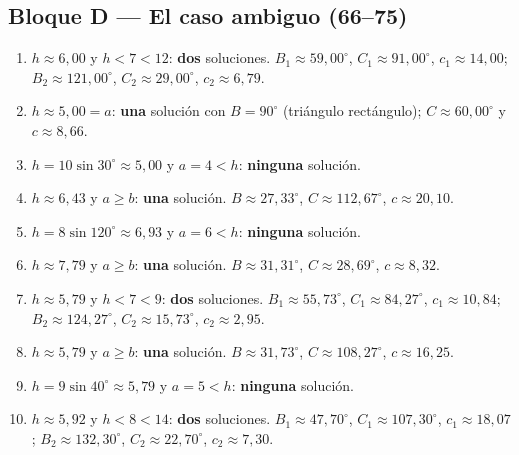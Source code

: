 \documentclass[12pt, letterpaper]{article}
\providecommand{\sen}{\sin}
\begin{document}
\subsection*{Bloque D — El caso ambiguo (66--75)}
\begin{enumerate}[leftmargin=*, label=\textbf{\arabic*.}, start=66]
  \item $h\approx 6{,}00$ y $h<7<12$: \textbf{dos} soluciones. $B_1\approx 59{,}00^\circ$, $C_1\approx 91{,}00^\circ$, $c_1\approx 14{,}00$; $B_2\approx 121{,}00^\circ$, $C_2\approx 29{,}00^\circ$, $c_2\approx 6{,}79$.
  \item $h\approx 5{,}00=a$: \textbf{una} solución con $B=90^\circ$ (triángulo rectángulo); $C\approx 60{,}00^\circ$ y $c\approx 8{,}66$.
  \item $h=10\sen 30^\circ\approx 5{,}00$ y $a=4<h$: \textbf{ninguna} solución.
  \item $h\approx 6{,}43$ y $a\ge b$: \textbf{una} solución. $B\approx 27{,}33^\circ$, $C\approx 112{,}67^\circ$, $c\approx 20{,}10$.
  \item $h=8\sen 120^\circ\approx 6{,}93$ y $a=6<h$: \textbf{ninguna} solución.
  \item $h\approx 7{,}79$ y $a\ge b$: \textbf{una} solución. $B\approx 31{,}31^\circ$, $C\approx 28{,}69^\circ$, $c\approx 8{,}32$.
  \item $h\approx 5{,}79$ y $h<7<9$: \textbf{dos} soluciones. $B_1\approx 55{,}73^\circ$, $C_1\approx 84{,}27^\circ$, $c_1\approx 10{,}84$; $B_2\approx 124{,}27^\circ$, $C_2\approx 15{,}73^\circ$, $c_2\approx 2{,}95$.
  \item $h\approx 5{,}79$ y $a\ge b$: \textbf{una} solución. $B\approx 31{,}73^\circ$, $C\approx 108{,}27^\circ$, $c\approx 16{,}25$.
  \item $h=9\sen 40^\circ\approx 5{,}79$ y $a=5<h$: \textbf{ninguna} solución.
  \item $h\approx 5{,}92$ y $h<8<14$: \textbf{dos} soluciones. $B_1\approx 47{,}70^\circ$, $C_1\approx 107{,}30^\circ$, $c_1\approx 18{,}07$; $B_2\approx 132{,}30^\circ$, $C_2\approx 22{,}70^\circ$, $c_2\approx 7{,}30$.
\end{enumerate}
\end{document}
